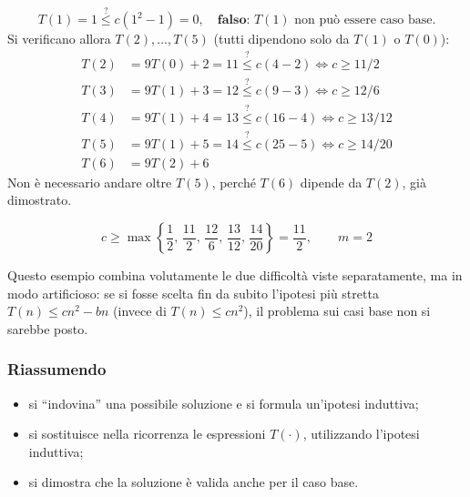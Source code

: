 \documentclass[12pt, a4paper]{article}
\begin{document}
\begin{tcolorbox}[colback=lightergray!5, colframe=tocsubsec, title=\textbf{Casi Base}]
$$T(1)=1 \overset{?}{\le} c(1^2-1)=0,\quad \textbf{falso: } T(1) \text{ non può essere caso base.}$$
Si verificano allora $T(2),\ldots,T(5)$ (tutti dipendono solo da $T(1)$ o $T(0)$):
\begin{align*}
T(2) &= 9T(0)+2=11 \overset{?}{\le} c(4-2) \iff c\ge 11/2 \\
T(3) &= 9T(1)+3=12 \overset{?}{\le} c(9-3) \iff c\ge 12/6 \\
T(4) &= 9T(1)+4=13 \overset{?}{\le} c(16-4) \iff c\ge 13/12 \\
T(5) &= 9T(1)+5=14 \overset{?}{\le} c(25-5) \iff c\ge 14/20 \\
T(6) &= 9T(2)+6
\end{align*}
Non è necessario andare oltre $T(5)$, perché $T(6)$ dipende da $T(2)$, già dimostrato.
\end{tcolorbox}

\begin{tcolorbox}[colback=lightergray!10, colframe=tocsec, title=\textbf{Parametri Finali}]
$$c\ge\max\left\{\frac{1}{2},\,\frac{11}{2},\,\frac{12}{6},\,\frac{13}{12},\,\frac{14}{20}\right\} = \frac{11}{2}, \qquad m=2$$
\end{tcolorbox}

\begin{tcolorbox}[colback=lightergray!5, colframe=tocsubsec, title=\textbf{Nota: l'Esempio è Artificiale}]
Questo esempio combina volutamente le due difficoltà viste separatamente, ma in modo artificioso: se si fosse scelta fin da subito l'ipotesi più stretta $T(n)\le cn^2-bn$ (invece di $T(n)\le cn^2$), il problema sui casi base non si sarebbe posto.
\end{tcolorbox}

\subsubsection{Riassumendo}

\begin{tcolorbox}[colback=lightergray!10, colframe=tocsec, title=\textbf{Metodo di Sostituzione}]
\begin{itemize}
    \item si ``indovina'' una possibile soluzione e si formula un'ipotesi induttiva;
    \item si sostituisce nella ricorrenza le espressioni $T(\cdot)$, utilizzando l'ipotesi induttiva;
    \item si dimostra che la soluzione è valida anche per il caso base.
\end{itemize}
\end{tcolorbox}
\end{document}
